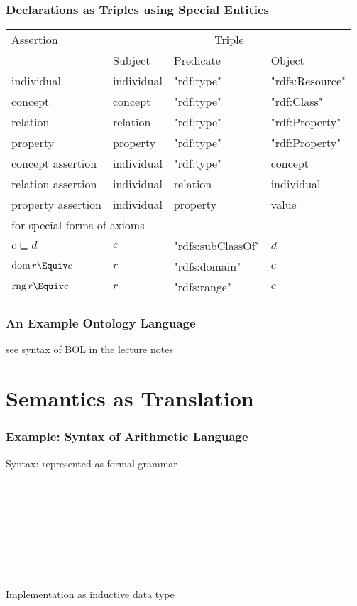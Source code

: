 \begin{frame}\frametitle{Declarations as Triples using Special Entities}
\begin{center}
\begin{tabular}{l|lll}
Assertion & \multicolumn{3}{c}{Triple} \\
          & Subject & Predicate & Object \\
\hline
individual & individual & "rdf:type" & "rdfs:Resource" \\
concept  & concept & "rdf:type" & "rdf:Class" \\
relation & relation & "rdf:type" & "rdf:Property" \\
property & property & "rdf:type" & "rdf:Property" \\
concept assertion  & individual & "rdf:type" & concept \\
relation assertion & individual & relation & individual \\
property assertion & individual & property & value \\
\hline
\multicolumn{4}{l}{for special forms of axioms}\\
$c\sqsubseteq d$ & $c$ & "rdfs:subClassOf" & $d$ \\
$\dom\,r\Equiv c$ & $r$ & "rdfs:domain" & $c$ \\
$\rng\, r\Equiv c$ & $r$ & "rdfs:range" & $c$ \\
\end{tabular}
\end{center}
\end{frame}

\begin{frame}\frametitle{An Example Ontology Language}
see syntax of BOL in the lecture notes
\end{frame}

\section{Semantics as Translation}

\begin{frame}\frametitle{Example: Syntax of Arithmetic Language}
Syntax: represented as formal grammar

\begin{commgrammar}
\\
\\
\\
\\
\\
\\
\\
\end{commgrammar}

Implementation as inductive data type
\end{frame}


